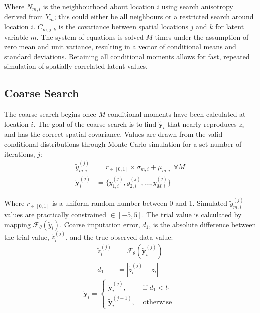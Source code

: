 Where $N_{m,i}$ is the neighbourhood about location $i$ using search anisotropy derived from $Y_{m}$; this could either be all neighbours or a restricted search around location $i$. $C_{m,j,k}$ is the covariance between spatial locations $j$ and $k$ for latent variable $m$. The system of equations is solved $M$ times under the assumption of zero mean and unit variance, resulting in a vector of conditional means and standard deviations. Retaining all conditional moments allows for fast, repeated simulation of spatially correlated latent values.

\subsection{Coarse Search}
\label{subsec:coarse}

The coarse search begins once $M$ conditional moments have been calculated at location $i$. The goal of the coarse search is to find $\tilde{\mathbf{y}}_{i}$ that nearly reproduces $z_{i}$ and has the correct spatial covariance. Values are drawn from the valid conditional distributions through Monte Carlo simulation for a set number of iterations, $j$:
\begin{align}
    \tilde{y}_{m, i}^{(j)}       & = r_{\in[0,1]} \times \sigma_{m,i} + \mu_{m,i} \ \ \forall M \\
    \tilde{\mathbf{y}}_{i}^{(j)} & = \{ y_{1, i}^{(j)}, y_{2, i}^{(j)}, \dots, y_{M, i}^{(j)}\}
\end{align}

Where $r_{\in[0,1]}$ is a uniform random number between 0 and 1. Simulated $\tilde{y}_{m, i}^{(j)}$ values are practically constrained $\in[-5, 5]$. The trial value is calculated by mapping $\mathcal{F}_{\theta}(\tilde{y}_{i})$. Coarse imputation error, $d_{1}$, is the absolute difference between the trial value, $\tilde{z}_{i}^{(j)}$, and the true observed data value:
\begin{align}
    \tilde{z}_{i}^{(j)} & = \mathcal{F}_{\theta}(\tilde{\mathbf{y}}_{i}^{(j)}) \\
    d_{1}               & = |\tilde{z}_{i}^{(j)} - z_{i}|
\end{align}
\begin{equation}
    \tilde{\mathbf{y}}_{i} =
    \begin{cases}
        \tilde{\mathbf{y}}_{i}^{(j)},   & \text{ if }d_{1} < t_{1} \\
        \tilde{\mathbf{y}}_{i}^{(j-1)}, & \text{ otherwise }
    \end{cases}
\end{equation}

